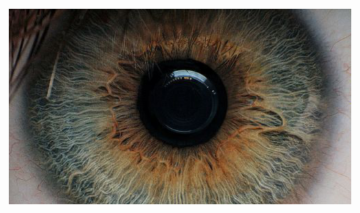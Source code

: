 \documentclass{article}
\begin{document}
\begin{figure}[H]
\begin{subfigure}{.47\textwidth}
  \centering
  \includegraphics[width=0.97\linewidth]{_Figures/raw_data_1_gaussian.png}
  \caption{}
  \label{fig:raw_1_gaussian}
\end{subfigure}


\end{figure}
\end{document}
